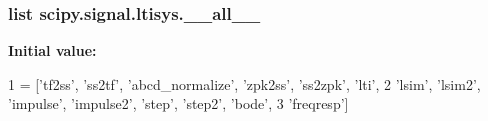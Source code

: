 \subsubsection[{\+\_\+\+\_\+all\+\_\+\+\_\+}]{\setlength{\rightskip}{0pt plus 5cm}list scipy.\+signal.\+ltisys.\+\_\+\+\_\+all\+\_\+\+\_\+}\label{namespacescipy_1_1signal_1_1ltisys_affd8c107dc80b4c2cd829f822d2b7678}
{\bfseries Initial value\+:}
\begin{DoxyCode}
1 = [\textcolor{stringliteral}{'tf2ss'}, \textcolor{stringliteral}{'ss2tf'}, \textcolor{stringliteral}{'abcd\_normalize'}, \textcolor{stringliteral}{'zpk2ss'}, \textcolor{stringliteral}{'ss2zpk'}, \textcolor{stringliteral}{'lti'},
2            \textcolor{stringliteral}{'lsim'}, \textcolor{stringliteral}{'lsim2'}, \textcolor{stringliteral}{'impulse'}, \textcolor{stringliteral}{'impulse2'}, \textcolor{stringliteral}{'step'}, \textcolor{stringliteral}{'step2'}, \textcolor{stringliteral}{'bode'},
3            \textcolor{stringliteral}{'freqresp'}]
\end{DoxyCode}

